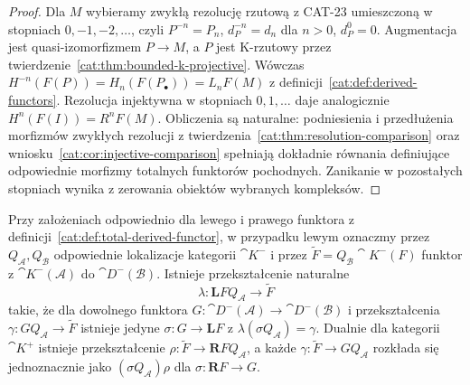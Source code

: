 \begin{proof}
Dla $M$ wybieramy zwykłą rezolucję rzutową z CAT-23 umieszczoną w stopniach $0,-1,-2,\ldots$, czyli $P^{-n}=P_n$, $d_P^{-n}=d_n$ dla $n>0$, $d_P^0=0$. Augmentacja jest quasi-izomorfizmem $P\to M$, a $P$ jest K-rzutowy przez twierdzenie~\ref{cat:thm:bounded-k-projective}. Wówczas $H^{-n}(F(P))=H_n(F(P_\bullet))=L_nF(M)$ z definicji~\ref{cat:def:derived-functors}. Rezolucja injektywna w stopniach $0,1,\ldots$ daje analogicznie $H^n(F(I))=R^nF(M)$. Obliczenia są naturalne: podniesienia i przedłużenia morfizmów zwykłych rezolucji z twierdzenia~\ref{cat:thm:resolution-comparison} oraz wniosku~\ref{cat:cor:injective-comparison} spełniają dokładnie równania definiujące odpowiednie morfizmy totalnych funktorów pochodnych. Zanikanie w pozostałych stopniach wynika z zerowania obiektów wybranych kompleksów.
\end{proof}
\begin{twierdzenie}\label{cat:thm:total-derived-universal}
Przy założeniach odpowiednio dla lewego i prawego funktora z definicji~\ref{cat:def:total-derived-functor}, w przypadku lewym oznaczmy przez $Q_{\mathcal A},Q_{\mathcal B}$ odpowiednie lokalizacje kategorii $\cat K^-$ i przez $\widetilde F=Q_{\mathcal B}\cat K^-(F)$ funktor z $\cat K^-(\mathcal A)$ do $\cat D^-(\mathcal B)$. Istnieje przekształcenie naturalne
\[
 \lambda:\mathbf L F Q_{\mathcal A}\longrightarrow\widetilde F
\]
takie, że dla dowolnego funktora $G:\cat D^-(\mathcal A)\to\cat D^-(\mathcal B)$ i przekształcenia $\gamma:GQ_{\mathcal A}\to\widetilde F$ istnieje jedyne $\sigma:G\to\mathbf L F$ z $\lambda(\sigma Q_{\mathcal A})=\gamma$. Dualnie dla kategorii $\cat K^+$ istnieje przekształcenie $\rho:\widetilde F\to\mathbf R F Q_{\mathcal A}$, a każde $\gamma:\widetilde F\to GQ_{\mathcal A}$ rozkłada się jednoznacznie jako $(\sigma Q_{\mathcal A})\rho$ dla $\sigma:\mathbf R F\to G$.
\end{twierdzenie}
